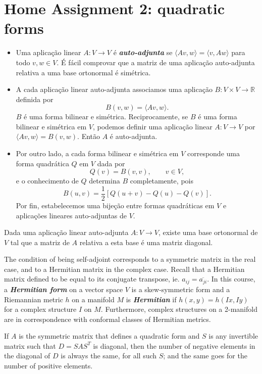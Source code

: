 \documentclass{article}
\newcommand{\fakesection}[1]{%
	\par\refstepcounter{section}%
	\sectionmark{#1}%
	\addcontentsline{toc}{section}{\protect\numberline{\thesection}#1}%
}
\numberwithin{equation}{section}
\newcommand{\R}{\mathbb{R}}
\begin{document}
\fakesection{}
\section{Home Assignment 2: quadratic forms}
\thispagestyle{fancy}
\begin{defn}\leavevmode
	\begin{itemize}
		\item Uma aplicação linear $A:V\to V$ é \textbf{\textit{auto-adjunta}} se $\langle Av,w\rangle=\langle v,Aw\rangle$ para todo $v,w\in V$. É fácil comprovar que a matriz de uma aplicação auto-adjunta relativa a uma base ortonormal é simétrica.
		\item A cada aplicação linear auto-adjunta associamos uma aplicação $B:V\times V\to \R$ definida por
		\[B(v,w)=\langle Av,w\rangle.\]
		$B$ é uma forma bilinear e simétrica. Reciprocamente, se $B$ é uma forma bilinear e simétrica em $V$, podemos definir uma aplicação linear $A:V\to V$ por $\langle Av,w\rangle=B(v,w)$. Então $A$ é auto-adjunta.
		\item Por outro lado, a cada forma bilinear e simétrica em $V$ corresponde uma forma quadrática $Q$ em $V$ dada por
		\[Q(v)=B(v,v),\qquad v\in V,\]
		e o conhecimento de $Q$ determina $B$ completamente, pois
		\[B(u,v)=\frac{1}{2}[Q(u+v)-Q(u)-Q(v)].\]
		Por fin, estabelecemos uma bijeção entre formas quadráticas em $V$ e aplicações lineares auto-adjuntas de $V$.
	\end{itemize}
\end{defn}
\begin{thm}
	Dada uma aplicação linear auto-adjunta $A:V\to V$, existe uma base ortonormal de $V$ tal que a matriz de $A$ relativa a esta base é uma matriz diagonal.
\end{thm}
\begin{remark}
	The condition of being self-adjoint corresponds to a symmetric matrix in the real case, and to a Hermitian matrix in the complex case. Recall that a Hermitian matrix defined to be equal to its conjugate transpose, ie. $a_{ij}=\overline{a_{ji}}$. In this course, a \textbf{\textit{Hermitian form}} on a vector space $V$ is a skew-symmetric form and a Riemannian metric $h$ on a manifold $M$ is \textbf{\textit{Hermitian}} if $h(x,y)=h(Ix,Iy)$ for a complex structure $I$ on $M$. Furthermore, complex structures on a 2-manifold are in correspondence with conformal classes of Hermitian metrics.
\end{remark}
\begin{thm}
	If $A$ is the symmetric matrix that defines a quadratic form and $S$ is any invertible matrix such that $D=SAS^T$ is diagonal, then the number of negative elements in the diagonal of $D$ is always the same, for all such $S$; and the same goes for the number of positive elements.
\end{thm}
\end{document}

